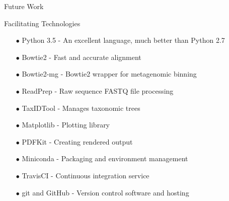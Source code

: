 \documentclass[final,t]{beamer}
\begin{document}
\begin{frame}{}
\begin{columns}[t]
\begin{column}{.3\linewidth}
\begin{block}{Future Work}
        \end{block}
        \begin{block}{Facilitating Technologies}
        \begin{itemize}
            \small
            \item[$\bullet$]Python 3.5 - An excellent language, much better than Python 2.7
            \item[$\bullet$]Bowtie2 - Fast and accurate alignment
            \item[$\bullet$]Bowtie2-mg - Bowtie2 wrapper for metagenomic binning
            \item[$\bullet$]ReadPrep - Raw sequence FASTQ file processing
            \item[$\bullet$]TaxIDTool - Manages taxonomic trees
            \item[$\bullet$]Matplotlib - Plotting library
            \item[$\bullet$]PDFKit - Creating rendered output
            \item[$\bullet$]Miniconda - Packaging and environment management
            \item[$\bullet$]TravisCI - Continuous integration service
            \item[$\bullet$]git and GitHub - Version control software and hosting
        \end{itemize}
        \end{block}





    \end{column}
  \end{columns}

\end{frame}
\end{document}
